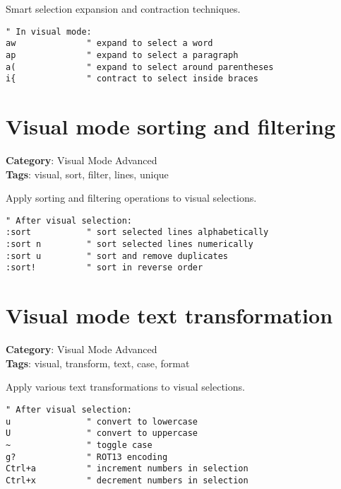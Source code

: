 {{{{{{{{{{{{{{{{{{{Smart selection expansion and contraction techniques.

\begin{Exa*}{}
\begin{Verbatim}[fontsize=\footnotesize, breaklines, breakanywhere]
" In visual mode:
aw              " expand to select a word
ap              " expand to select a paragraph
a(              " expand to select around parentheses
i{              " contract to select inside braces
\end{Verbatim}
\end{Exa*}

\section{Visual mode sorting and filtering}

\textbf{Category}: Visual Mode Advanced\\ \textbf{Tags}: visual, sort, filter, lines, unique
\vspace{0.5cm}

Apply sorting and filtering operations to visual selections.

\begin{Exa*}{}
\begin{Verbatim}[fontsize=\footnotesize, breaklines, breakanywhere]
" After visual selection:
:sort           " sort selected lines alphabetically
:sort n         " sort selected lines numerically
:sort u         " sort and remove duplicates
:sort!          " sort in reverse order
\end{Verbatim}
\end{Exa*}

\section{Visual mode text transformation}

\textbf{Category}: Visual Mode Advanced\\ \textbf{Tags}: visual, transform, text, case, format
\vspace{0.5cm}

Apply various text transformations to visual selections.

\begin{Exa*}{}
\begin{Verbatim}[fontsize=\footnotesize, breaklines, breakanywhere]
" After visual selection:
u               " convert to lowercase
U               " convert to uppercase
~               " toggle case
g?              " ROT13 encoding
Ctrl+a          " increment numbers in selection
Ctrl+x          " decrement numbers in selection
\end{Verbatim}
\end{Exa*}

}}}}}}}}}}}}}}}}}}}
